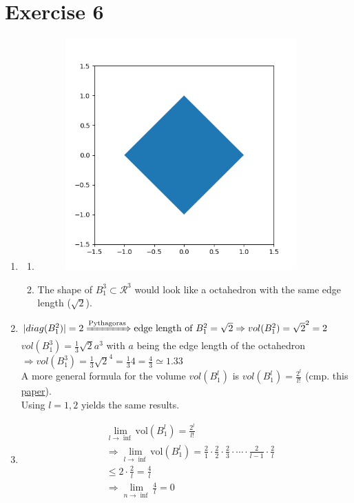 \documentclass[12pt]{article}
\begin{document}
\section*{Exercise 6}
\begin{enumerate}[label= (\alph*)]
    \item   \begin{enumerate}[label= (\roman*)]
                \item  \begin{figure}[H]
                            \centering
                            \includegraphics[width=3.5in]{code/exercise_06_a.png}
                        \end{figure}
                \item The shape of \(B^3_1 \subset \mathcal{R}^3\) would look like a octahedron with the same edge length ($\sqrt{2}$).
            \end{enumerate}
    \item \(|diag(B^2_1)| = 2 \xRightarrow{\text{Pythagoras}} \text{edge length of }B^2_1 = \sqrt{2} \Rightarrow vol(B^2_1) = \sqrt{2}^2 = 2\) \\
        \(vol(B^3_1) = \frac{1}{3}\sqrt{2}a^3\) with $a$ being the edge length of the octahedron \(\Rightarrow vol(B^3_1) = \frac{1}{3}\sqrt{2}^4 = \frac{1}{3}4 = \frac{4}{3} \simeq  1.33\)\\
        A more general formula for the volume \(vol(B^l_1)\) is \(vol(B^l_1) = \frac{2^l}{l!}\) (cmp. this \href{https://doi.org/10.2307/30044198}{paper}).\\
        Using \(l = 1, 2\) yields the same results.
    \item
        \begin{align*}
            &\lim_{l\rightarrow\inf}{\text{vol}(B^l_1) = \frac{2^l}{l!}}\\
            &\Rightarrow \lim_{l\rightarrow\inf}{\text{vol}(B^l_1)} = \frac{2}{1}\cdot \frac{2}{2}\cdot \frac{2}{3}\cdot \dotsb \cdot\frac{2}{l-1}\cdot \frac{2}{l}\\
            & \leq 2 \cdot \frac{2}{l}  = \frac{4}{l} \\
            &\Rightarrow \lim_{n\rightarrow\inf}{\frac{4}{l}} = 0
        \end{align*}

\end{enumerate}
\end{document}

